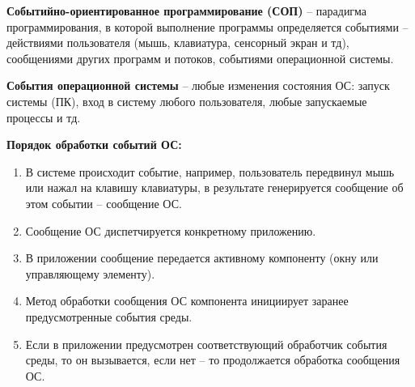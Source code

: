 {\bf{Событийно-ориентированное программирование (СОП)}} – парадигма программирования, в которой выполнение программы определяется событиями – действиями пользователя (мышь, клавиатура, сенсорный экран и тд), сообщениями других программ и потоков, событиями операционной системы.

{\bf{События операционной системы}} – любые изменения состояния ОС: запуск системы (ПК), вход в систему любого пользователя, любые запускаемые процессы и тд.

\noindent
{\bf{Порядок обработки событий ОС:}}
\begin{enumerate}
    \item В системе происходит событие, например, пользователь передвинул мышь или нажал на клавишу клавиатуры, в результате генерируется сообщение об этом событии – сообщение ОС. 
    \item Сообщение ОС диспетчируется конкретному приложению.
    \item В приложении сообщение передается активному компоненту (окну или управляющему элементу). 
    \item Метод обработки сообщения ОС компонента инициирует заранее предусмотренные события среды.
    \item Если в приложении предусмотрен соответствующий обработчик события среды, то он вызывается, если нет – то продолжается обработка сообщения ОС.     
\end{enumerate}

